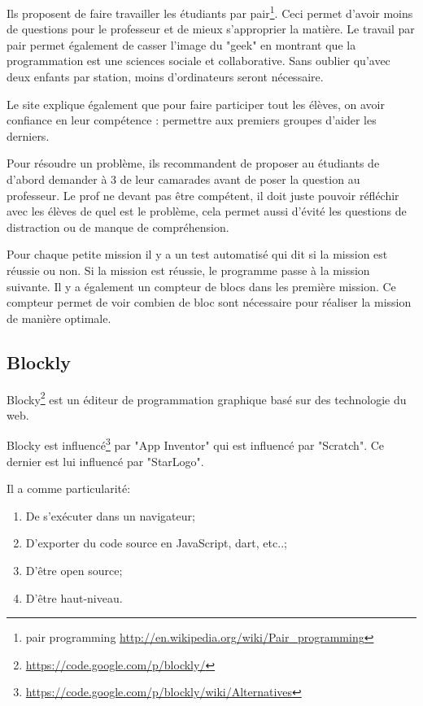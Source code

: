 Ils proposent de faire travailler les étudiants par pair\footnote{pair programming \url{http://en.wikipedia.org/wiki/Pair\_programming}}. Ceci permet d'avoir moins de questions pour le professeur et de mieux s'approprier la matière. Le travail par pair permet également de casser l'image du "geek" en montrant que la programmation est une sciences sociale et collaborative. Sans oublier qu'avec deux enfants par station, moins d'ordinateurs seront nécessaire.

Le site explique également que pour faire participer tout les élèves, on avoir confiance en leur compétence : permettre aux premiers groupes d'aider les derniers.

Pour résoudre un problème, ils recommandent de proposer au étudiants de d'abord demander à 3 de leur camarades avant de poser la question au professeur. Le prof ne devant pas être compétent, il doit juste pouvoir réfléchir avec les élèves de quel est le problème, cela permet aussi d'évité les questions de distraction ou de manque de compréhension.

Pour chaque petite mission il y a un test automatisé qui dit si la mission est réussie ou non. Si la mission est réussie, le programme passe à la mission suivante. Il y a également un compteur de blocs dans les première mission. Ce compteur permet de voir combien de bloc sont nécessaire pour réaliser la mission de manière optimale.

\subsection{Blockly}
\label{blockly}


Blocky\footnote{\url{https://code.google.com/p/blockly/}} est un éditeur de programmation graphique basé sur des technologie du web. 

Blocky est influencé\footnote{\url{https://code.google.com/p/blockly/wiki/Alternatives}} par "App Inventor" qui est influencé par "Scratch". Ce dernier est lui influencé par "StarLogo".

Il a comme particularité:
\begin{enumerate}
\item De s'exécuter dans un navigateur;
\item D'exporter du code source en JavaScript, dart, etc..;
\item D'être open source;
\item D'être haut-niveau.
\end{enumerate}

